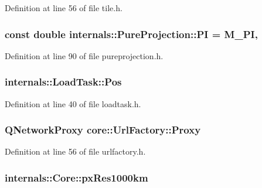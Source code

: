 Definition at line 56 of file tile.\-h.

\hypertarget{group___o_p_map_widget_gaab58a4dd2b2aec1a140df479c3da07c5}{
\subsubsection[{P\-I}]{\setlength{\rightskip}{0pt plus 5cm}const {\bf double} internals\-::\-Pure\-Projection\-::\-P\-I = M\-\_\-\-P\-I\hspace{0.3cm}{\ttfamily [static]}, {\ttfamily [protected]}}}\label{group___o_p_map_widget_gaab58a4dd2b2aec1a140df479c3da07c5}


Definition at line 90 of file pureprojection.\-h.

\hypertarget{group___o_p_map_widget_gaaaf77679e16ef9213c85fbfaff467339}{
\subsubsection[{Pos}]{ internals\-::\-Load\-Task\-::\-Pos}}\label{group___o_p_map_widget_gaaaf77679e16ef9213c85fbfaff467339}


Definition at line 40 of file loadtask.\-h.

\hypertarget{group___o_p_map_widget_ga4851a6205d1885048a3417f736ec8679}{
\subsubsection[{Proxy}]{\setlength{\rightskip}{0pt plus 5cm}Q\-Network\-Proxy core\-::\-Url\-Factory\-::\-Proxy}}\label{group___o_p_map_widget_ga4851a6205d1885048a3417f736ec8679}


Definition at line 56 of file urlfactory.\-h.

\hypertarget{group___o_p_map_widget_ga5abde0bbaaa9517978da18398333e69b}{
\subsubsection[{px\-Res1000km}]{ internals\-::\-Core\-::px\-Res1000km\hspace{0.3cm}{\ttfamily [protected]}}}\label{group___o_p_map_widget_ga5abde0bbaaa9517978da18398333e69b}


